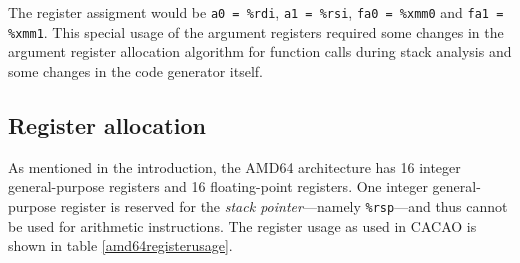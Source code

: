 The register assigment would be \texttt{a0 = \%rdi}, \texttt{a1 =
\%rsi}, \texttt{fa0 = \%xmm0} and \texttt{fa1 = \%xmm1}. This special
usage of the argument registers required some changes in the argument
register allocation algorithm for function calls during stack
analysis and some changes in the code generator itself.


\subsection{Register allocation}
\label{sectionamd64registerallocation}

As mentioned in the introduction, the AMD64 architecture has 16
integer general-purpose registers and 16 floating-point registers. One
integer general-purpose register is reserved for the \textit{stack
pointer}---namely \texttt{\%rsp}---and thus cannot be used for
arithmetic instructions. The register usage as used in CACAO is shown
in table \ref{amd64registerusage}.

